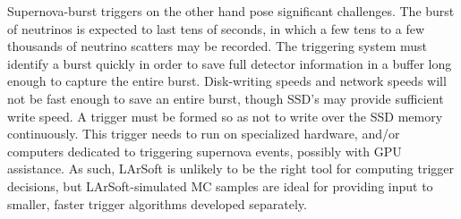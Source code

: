  Supernova-burst triggers on the other hand pose significant challenges.  The burst of neutrinos is expected
to last tens of seconds, in which a few tens to a few thousands of neutrino scatters may be recorded.  The
triggering system must identify a burst quickly in order to save full detector information in a buffer
long enough to capture the entire burst.  Disk-writing speeds and network speeds will not be fast enough
to save an entire burst, though SSD's may provide sufficient write speed.  A trigger must be formed so 
as not to write over the SSD memory continuously.  This trigger needs to run on specialized hardware, and/or
computers dedicated to triggering supernova events, possibly with GPU assistance.  As such, LArSoft is
unlikely to be the right tool for computing trigger decisions, but LArSoft-simulated MC samples are
ideal for providing input to smaller, faster trigger algorithms developed separately.

